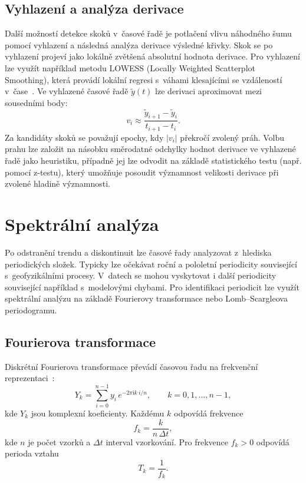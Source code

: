 \subsection{Vyhlazení a analýza derivace}

Další možností detekce skoků v~časové řadě je potlačení vlivu náhodného šumu pomocí vyhlazení a následná analýza derivace výsledné křivky. Skok se po vyhlazení projeví jako lokálně zvětšená absolutní hodnota derivace. Pro vyhlazení lze využít například metodu LOWESS (Locally Weighted Scatterplot Smoothing), která provádí lokální regresi s~váhami klesajícími se vzdáleností v~čase~\cite{statsmodels_lowess}. Ve vyhlazené časové řadě \( \tilde{y}(t) \) lze derivaci aproximovat mezi sousedními body:
\begin{equation}
v_i \approx \frac{\tilde{y}_{i+1}-\tilde{y}_i}{t_{i+1}-t_i}.
\label{eq:derivative}
\end{equation}
Za kandidáty skoků se považují epochy, kdy \(|v_i|\) překročí zvolený práh. Volbu prahu lze založit na násobku směrodatné odchylky hodnot derivace ve vyhlazené řadě jako heuristiku, případně jej lze odvodit na základě statistického testu (např. pomocí z-testu), který umožňuje posoudit významnost velikosti derivace při zvolené hladině významnosti.

\section{Spektrální analýza}
\label{3-5-spektralni}

Po odstranění trendu a diskontinuit lze časové řady analyzovat z~hlediska periodických složek. Typicky lze očekávat roční a pololetní periodicity související s~geofyzikálními procesy. V~datech se mohou vyskytovat i další periodicity související například s~modelovými chybami. Pro identifikaci periodicit lze využít spektrální analýzu na základě Fourierovy transformace nebo Lomb--Scargleova periodogramu.

\subsection{Fourierova transformace}

Diskrétní Fourierova transformace převádí časovou řadu na frekvenční reprezentaci~\cite{bos_2019_time_series}:
\begin{equation}
Y_k = \sum_{i=0}^{n-1} y_i\, e^{-2\pi \mathrm{i} k~i/n}, \qquad k=0,1,\dots,n-1,
\label{eq:dft}
\end{equation}
kde \(Y_k\) jsou komplexní koeficienty. Každému \(k\) odpovídá frekvence
\begin{equation}
f_k = \frac{k}{n\,\Delta t},
\label{eq:freq}
\end{equation}
kde \(n\) je počet vzorků a \(\Delta t\) interval vzorkování. Pro frekvence \(f_k > 0\) odpovídá perioda vztahu
\begin{equation}
T_k = \frac{1}{f_k}.
\label{eq:period}
\end{equation}

